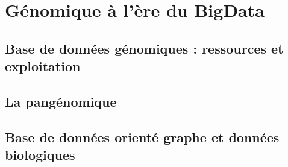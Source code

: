 



\chapter{Génomique à l'ère du BigData}
\section{Base de données génomiques : ressources et exploitation}
\label{sec:db}
\section{La pangénomique}
\section{Base de données orienté graphe et données biologiques}